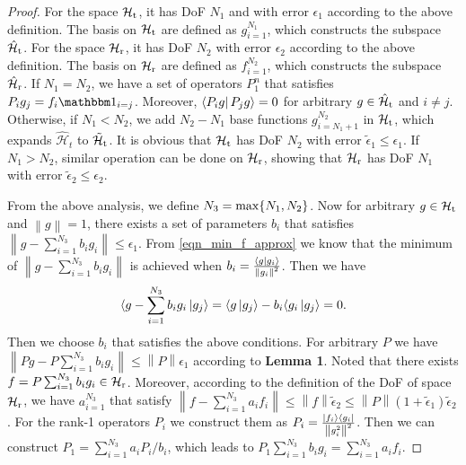 \documentclass[12pt,draftclsnofoot,journal,onecolumn]{IEEEtran}
\begin{document}
	\begin{proof}
		For the space $\mathcal{H}_{\rm t}$, it has DoF $N_1$ and with error $\epsilon_1$ according to the above definition. The basis on $\mathcal{H}_{\rm t}$ are defined as $g_{i=1}^{N_1}$, which constructs the subspace $\hat{\mathcal{H}}_{\rm t}$. For the space $\mathcal{H}_{\rm r}$, it has DoF $N_2$ with error $\epsilon_2$ according to the above definition. The basis on $\mathcal{H}_{\rm r}$ are defined as $f_{i=1}^{N_2}$, which constructs the subspace $\hat{\mathcal{H}}_{\rm r}$. If $N_1=N_2$, we have a set of operators $P_1^n$ that satisfies $P_ig_j=f_i {\mathbbm 1}_{i=j}$. Moreover, $\bra{P_i g}P_j g\rangle =0$ for arbitrary $g \in \hat{\mathcal{H}}_{\rm t}$ and $i \neq j$. Otherwise, if $N_1<N_2$, we add $N_2-N_1$ base functions $g_{i=N_1+1}^{N_2}$ in $\mathcal{H}_{\rm t}$, which expands $\hat{\mathcal{H}}_t$ to $\tilde{\mathcal{H}}_{\rm t}$. It is obvious that $\mathcal{H}_{\rm t}$ has DoF $N_2$ with error $\tilde{\epsilon}_1\leqslant \epsilon_1$. If $N_1>N_2$, similar operation can be done on $\mathcal{H}_{\rm r}$, showing that $\mathcal{H}_{\rm r}$ has DoF $N_1$ with error $\tilde{\epsilon}_2\leqslant \epsilon_2$.
		
		From the above analysis, we define $N_3 = {\rm max}\{N_1,N_2\}$.
		Now for arbitrary $g \in \mathcal{H}_{\rm t} $ and $\left\| g\right\|=1$, there exists a set of parameters $b_i$ that satisfies $\left\|g-\sum_{i=1}^{N_3}b_ig_i \right\| \leqslant \epsilon_1$. From \eqref{eqn_min_f_approx} we know that the minimum of $\left\|g-\sum_{i=1}^{N_3}b_ig_i\right\|$ is achieved when $b_i = \frac{ \langle g \ket{g_i}}{\left\| g_i \right\|^2}$. Then we have
		\begin{equation}
			\begin{aligned}
				\langle g-\sum_{i=1}^{N_3}b_ig_i \ket{g_j} =\langle g\ket{g_j} - b_i \langle g_i\ket{g_j}=0.
			\end{aligned}
		\end{equation}
 Then we choose $b_i$ that satisfies the above conditions. For arbitrary $P$ we have $\left\| Pg-P \sum_{i=1}^{N_3}b_ig_i \right\| \leqslant \left\| P \right\| \epsilon_1$ according to {\bf Lemma 1}. Noted that there exists $f=P\sum_{i=1}^{N_3}b_ig_i \in \mathcal{H}_{\rm r}$. Moreover, according to the definition of the DoF of space $\mathcal{H}_{\rm r}$, we have $a_{i=1}^{N_3}$ that satisfy $\left\| f-\sum_{i=1}^{N_3} a_i f_i  \right\| \leqslant \left\| f \right\| \tilde{\epsilon}_2 \leqslant \left\|  P \right\| (1+\tilde{\epsilon}_1) \tilde{\epsilon}_2$. For the rank-1 operators $P_i$ we construct them as $P_i = \frac{\ket{f_i} \bra{g_i}}{\left\| g_i^2\right\|^2}$. Then we can construct $P_1 = \sum_{i=1}^{N_3} a_i P_i/b_i$, which leads to $P_1\sum_{i=1}^{N_3}b_ig_i =\sum_{i=1}^{N_3} a_i f_i $.
		

\end{proof}
\end{document}
